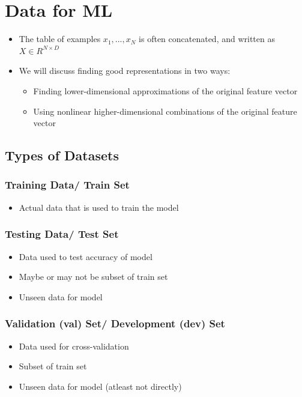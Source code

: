 \chapter{Data for ML}

\begin{itemize}
    \item The table of examples ${x_1, ..., x_N}$ is often concatenated, and written as $X \in R^{N \times D}$
    \item We will discuss finding good representations in two ways:
    \begin{itemize}
        \item Finding lower-dimensional approximations of the original feature vector
        \item Using nonlinear higher-dimensional combinations of the original feature vector
    \end{itemize}
\end{itemize}


\section{Types of Datasets}\label{Types of Datasets}

\subsection{Training Data/ Train Set}\label{Training Data/ Train Set}
\begin{itemize}
    \item Actual data that is used to train the model
\end{itemize}

\subsection{Testing Data/ Test Set}\label{Testing Data/ Test Set}
\begin{itemize}
    \item Data used to test accuracy of model
    \item Maybe or may not be subset of train set
    \item Unseen data for model
\end{itemize}

\subsection{Validation (val) Set/ Development (dev) Set}\label{Validation (val) Set/ Development (dev) Set}
\begin{itemize}
    \item Data used for cross-validation
    \item Subset of train set
    \item Unseen data for model (atleast not directly)
\end{itemize}

